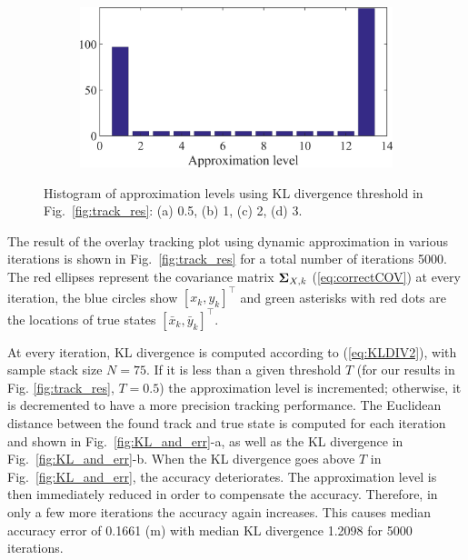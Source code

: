 \begin{figure}
\begin{subfigure}[tb]{0.2\textwidth}
        \caption{}
    \end{subfigure}
        \begin{subfigure}[tb]{0.2\textwidth}
        \includegraphics[width=\textwidth]{img/Hist_KL_3.png}
        \caption{}
    \end{subfigure}
    \caption{Histogram of approximation levels using KL divergence threshold in Fig.~\ref{fig:track_res}: (a) 0.5, (b) 1, (c) 2, (d) 3.}
    \label{fig:track_hist}
\end{figure}














The result of the overlay tracking plot using dynamic approximation in various iterations is shown in Fig.~\ref{fig:track_res} for a total number of iterations 5000. 
The red ellipses represent the covariance matrix ${\bf \Sigma}_{X,k}$ (\ref{eq:correctCOV}) at every iteration, the blue circles show $[x_k, y_k]^\intercal$ and green asterisks with red dots are the locations of true states $[\bar{x}_k, \bar{y}_k]^\intercal$. 

At every iteration, KL divergence is computed according to (\ref{eq:KLDIV2}), with sample stack size $N = 75$.  If it is less than a given threshold $T$ (for our results in Fig. \ref{fig:track_res}, $T = 0.5$) the approximation level is incremented; otherwise, it is decremented to have a more precision tracking performance. The Euclidean distance between the found track and true state is computed for each iteration and shown in Fig.~\ref{fig:KL_and_err}-a, as well as the KL divergence in Fig.~\ref{fig:KL_and_err}-b. When the KL divergence goes above $T$ in Fig.~\ref{fig:KL_and_err}, the accuracy deteriorates. The approximation level is then immediately reduced in order to compensate the accuracy. Therefore, in only a few more iterations the accuracy again increases. This causes median accuracy error of 0.1661 (m) with median KL divergence 1.2098 for 5000 iterations.

